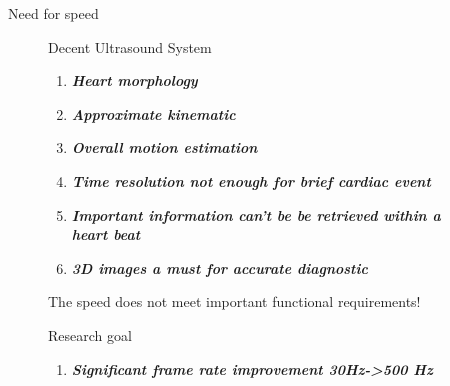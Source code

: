 \documentclass[t,12pt,english
\ifx\beamermode\undefined\else,\beamermode\fi
]{beamer}
\begin{document}
\begin{frame}{Need for speed}


\begin{figure}[!htb]

\begin{block}{\footnotesize{Decent Ultrasound System}}\tiny{}
\begin{enumerate} 
\vspace{0.05cm}
     \item \tiny{\textbf{\textit{Heart morphology}}}
     \item \tiny{\textbf{\textit{Approximate kinematic}}} 
     \item \tiny{\textbf{\textit{Overall motion estimation}}}
     \color{red} 
     \item \tiny{\textbf{\textit{Time resolution not enough for brief cardiac event}}}
     \item \tiny{\textbf{\textit{Important information can't be be retrieved within a heart beat}}}
     \item \tiny{\textbf{\textit{3D images a must for accurate diagnostic}}}\\
\end{enumerate}
\end{block}
\color{red} 
\tiny{The speed does not meet important functional requirements!}  
\begin{block}{\footnotesize{Research goal}}\tiny{}
\begin{enumerate} 
\vspace{0.05cm}
     \item \tiny{\textbf{\textit{Significant frame rate improvement 30Hz->500 Hz}}}
   
\end{enumerate}
\end{block}


\end{figure}
\end{frame}
\end{document}
